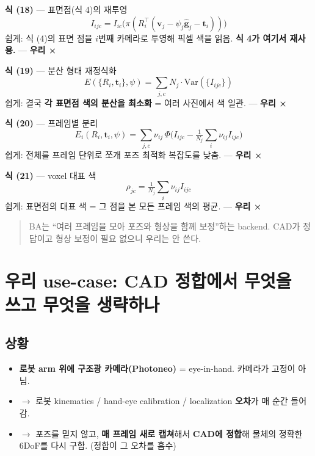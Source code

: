 \textbf{식 (18)} --- 표면점(식 4)의 재투영
\begin{equation*}
  I_{ijc} = I_{ic}\big(\pi(R_i^{\top}(\mathbf{v}_j
            - \psi_j\hat{\mathbf{g}}_j - \mathbf{t}_i))\big)
  \tag{18}
\end{equation*}
쉽게: 식 (4)의 표면 점을 $i$번째 카메라로 투영해 픽셀 색을 읽음. \textbf{식 4가
여기서 재사용.} --- \textbf{우리 ×}

\textbf{식 (19)} --- 분산 형태 재정식화
\begin{equation*}
  E(\{R_i,\mathbf{t}_i\},\psi)
  = \sum_{j,c} N_j\cdot \mathrm{Var}(\{I_{ijc}\})
  \tag{19}
\end{equation*}
쉽게: 결국 \textbf{각 표면점 색의 분산을 최소화} = 여러 사진에서 색 일관.
--- \textbf{우리 ×}

\textbf{식 (20)} --- 프레임별 분리
\begin{equation*}
  E_i(R_i,\mathbf{t}_i,\psi)
  = \sum_{j,c} \nu_{ij}\,
    \Phi\!\Big(I_{ijc} - \tfrac{1}{N_j}\textstyle\sum_i \nu_{ij} I_{ijc}\Big)
  \tag{20}
\end{equation*}
쉽게: 전체를 프레임 단위로 쪼개 포즈 최적화 복잡도를 낮춤. --- \textbf{우리 ×}

\textbf{식 (21)} --- voxel 대표 색
\begin{equation*}
  \rho_{jc} = \tfrac{1}{N_j}\textstyle\sum_i \nu_{ij} I_{ijc}
  \tag{21}
\end{equation*}
쉽게: 표면점의 대표 색 = 그 점을 본 모든 프레임 색의 평균. --- \textbf{우리 ×}

\begin{quote}
  \small BA는 ``여러 프레임을 모아 포즈와 형상을 함께 보정''하는 backend.
  CAD가 정답이고 형상 보정이 필요 없으니 우리는 안 쓴다.
\end{quote}

\section{우리 use-case: CAD 정합에서 무엇을 쓰고 무엇을 생략하나}

\subsection{상황}

\begin{itemize}
  \item \textbf{로봇 arm 위에 구조광 카메라(Photoneo)} = eye-in-hand. 카메라가
  고정이 아님.
  \item $\to$ 로봇 kinematics / hand-eye calibration / localization
  \textbf{오차}가 매 순간 들어감.
  \item $\to$ 포즈를 믿지 않고, \textbf{매 프레임 새로 캡쳐}해서 \textbf{CAD에
  정합}해 물체의 정확한 6DoF를 다시 구함. (정합이 그 오차를 흡수)
\end{itemize}

